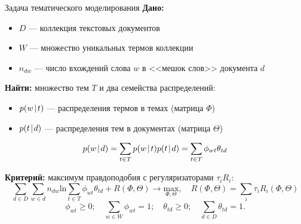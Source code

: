 \begin{frame}[t]{Задача тематического моделирования}
\textbf{Дано:}
\begin{itemize}
    \item $D$ --- коллекция текстовых документов
    \item $W$ --- множество уникальных термов коллекции
    \item $n_{dw}$ --- число вхождений слова $w$ в <<мешок слов>> документа $d$
\end{itemize}

\medskip
\textbf{Найти:}
множество тем $T$ и два семейства распределений:
\smallskip
\begin{itemize}
    \item $p(w \mspace{2mu}{|}\mspace{2mu} t)$ --- распределения термов в темах (матрица $\Phi$)
    \item $p(t \mspace{2mu}{|}\mspace{2mu} d)$ --- распределения тем в документах (матрица $\Theta$)
\end{itemize}

\[
p(w \mspace{2mu}{|}\mspace{2mu} d) = \sum_{t \in T} p(w \mspace{2mu}{|}\mspace{2mu} t)p(t \mspace{2mu}{|}\mspace{2mu} d) = \sum_{t \in T} \phi_{wt}\theta_{td}
\]

\smallskip
\textbf{Критерий:} максимум правдоподобия с регуляризаторами $\tau_i R_i$:
\[
    \sum_{d \in D} \sum_{w \in d} n_{dw} \mathrm{ln} \sum_{t \in T} \phi_{wt} \theta_{td} + R(\Phi, \Theta) \rightarrow \underset{\Phi, \Theta}{\mathrm{max}}, \quad R(\Phi, \Theta) = \sum_{i} \tau_i R_i(\Phi, \Theta)
\]
\[
\phi_{wt} \ge 0; \quad \sum_{w \in W} \phi_{wt} = 1; \quad \theta_{td} \ge 0; \quad \sum_{d \in D} \theta_{td} = 1.
\]
\bigskip

\end{frame}


